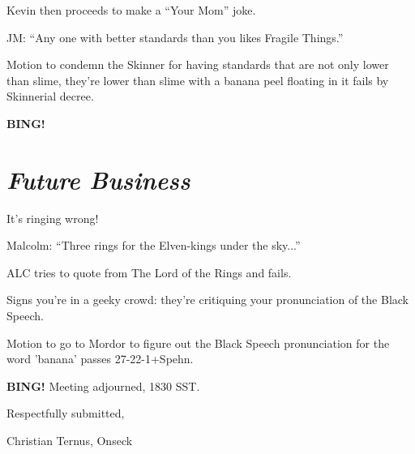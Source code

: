 \documentclass[10pt]{article}
\newcommand{\bing}{{\bf BING!} }
\newcommand{\goto}[1]{\bing \vskip 12pt \section*{{\em{#1}}}}
\begin{document}
Kevin then proceeds to make a ``Your Mom'' joke.

JM: ``Any one with better standards than you likes Fragile Things.''

Motion to condemn the Skinner for having standards that are not only lower than slime, they're lower than
slime with a banana peel floating in it fails by Skinnerial decree.

\goto{Future Business}

It's ringing wrong!

Malcolm: ``Three rings for the Elven-kings under the sky...''

ALC tries to quote from The Lord of the Rings and fails.

Signs you're in a geeky crowd: they're critiquing your pronunciation of the Black Speech.

Motion to go to Mordor to figure out the Black Speech pronunciation for the word 'banana' passes 27-22-1+Spehn.

\bing
\noindent
Meeting adjourned, 1830 SST.

\vspace{18pt}

\centerline{Respectfully submitted,}
\centerline{Christian Ternus, Onseck}
\end{document}
